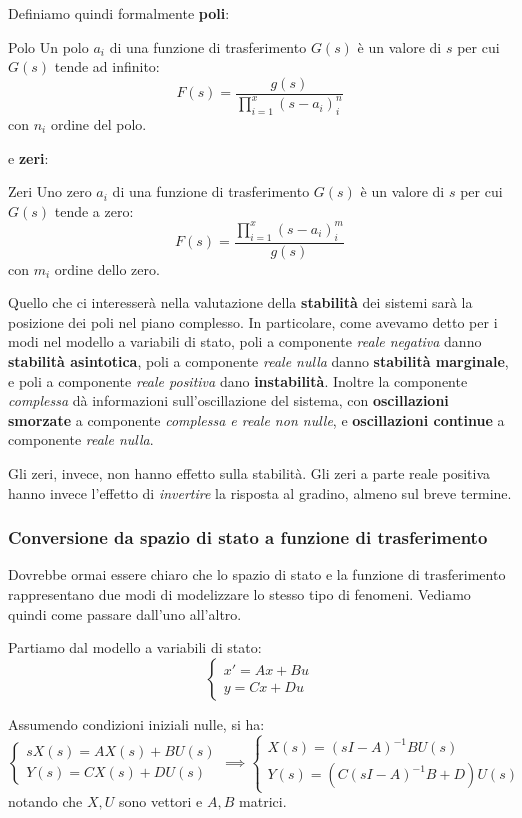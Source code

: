 \documentclass[a4paper,11pt]{article}
\begin{document}
Definiamo quindi formalmente \textbf{poli}:
\begin{definition}{Polo}
	Un polo $a_i$ di una funzione di trasferimento $G(s)$ è un valore di $s$ per cui $G(s)$ tende ad infinito:
	$$
	F(s) = \frac{g(s)}{\prod_{i = 1}^x (s - a_i)^n_i}
	$$
	con $n_i$ ordine del polo.
\end{definition}
e \textbf{zeri}:
\begin{definition}{Zeri}
	Uno zero $a_i$ di una funzione di trasferimento $G(s)$ è un valore di $s$ per cui $G(s)$ tende a zero: 
	$$
	F(s) = \frac{\prod_{i = 1}^x (s - a_i)^m_i}{g(s)}
	$$
	con $m_i$ ordine dello zero.
\end{definition}

Quello che ci interesserà nella valutazione della \textbf{stabilità} dei sistemi sarà la posizione dei poli nel piano complesso.
In particolare, come avevamo detto per i modi nel modello a variabili di stato, poli a componente \textit{reale negativa} danno \textbf{stabilità asintotica}, poli a componente \textit{reale nulla} danno \textbf{stabilità marginale}, e poli a componente \textit{reale positiva} dano \textbf{instabilità}.
Inoltre la componente \textit{complessa} dà informazioni sull'oscillazione del sistema, con \textbf{oscillazioni smorzate} a componente \textit{complessa e reale non nulle}, e \textbf{oscillazioni continue} a componente \textit{reale nulla}.

Gli zeri, invece, non hanno effetto sulla stabilità.
Gli zeri a parte reale positiva hanno invece l'effetto di \textit{invertire} la risposta al gradino, almeno sul breve termine.

\subsubsection{Conversione da spazio di stato a funzione di trasferimento}
Dovrebbe ormai essere chiaro che lo spazio di stato e la funzione di trasferimento rappresentano due modi di modelizzare lo stesso tipo di fenomeni.
Vediamo quindi come passare dall'uno all'altro.

Partiamo dal modello a variabili di stato:
\[
	\begin{cases}
		x' = Ax + Bu \\
		y = Cx + Du
	\end{cases}
\]

Assumendo condizioni iniziali nulle, si ha:
\[
	\begin{cases}
		s X(s) = A X(s) + B U(s)  \\ 
		Y(s) = C X(s) + D U(s) 
	\end{cases} \implies
	\begin{cases}
		X(s) = (sI - A)^{-1} B U(s) \\
		Y(s) = \left( C(sI - A)^{-1} B + D \right) U(s)
	\end{cases}
\]
notando che $X, U$ sono vettori e $A, B$ matrici.
\end{document}
